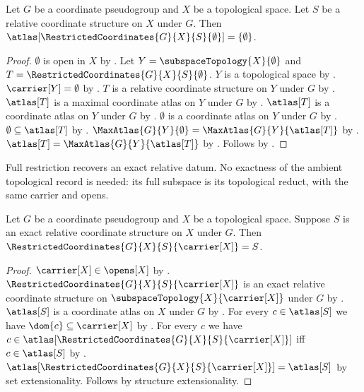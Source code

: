 \begin{theorem}\label{restricted_coordinates_empty_atlas}
    Let $G$ be a coordinate pseudogroup and $X$ be a topological space.
    Let $S$ be a relative coordinate structure on $X$ under $G$.
    Then $\atlas[\RestrictedCoordinates{G}{X}{S}{\emptyset}]=\{\emptyset\}$.
\end{theorem}
\begin{proof}
    $\emptyset$ is open in $X$ by .
    Let $Y=\subspaceTopology{X}{\emptyset}$ and $T=\RestrictedCoordinates{G}{X}{S}{\emptyset}$.
    $Y$ is a topological space by .
    $\carrier[Y]=\emptyset$ by .
    $T$ is a relative coordinate structure on $Y$ under $G$ by .
    $\atlas[T]$ is a maximal coordinate atlas on $Y$ under $G$ by .
    $\atlas[T]$ is a coordinate atlas on $Y$ under $G$ by .
    $\emptyset$ is a coordinate atlas on $Y$ under $G$ by .
    $\emptyset\subseteq\atlas[T]$ by .
    $\MaxAtlas{G}{Y}{\emptyset}=\MaxAtlas{G}{Y}{\atlas[T]}$ by
        .
    $\atlas[T]=\MaxAtlas{G}{Y}{\atlas[T]}$ by .
    Follows by .
\end{proof}

Full restriction recovers an exact relative datum. No exactness of the
ambient topological record is needed: its full subspace is its topological
reduct, with the same carrier and opens.

\begin{theorem}\label{restricted_coordinates_full}
    Let $G$ be a coordinate pseudogroup and $X$ be a topological space.
    Suppose $S$ is an exact relative coordinate structure on $X$ under $G$.
    Then $\RestrictedCoordinates{G}{X}{S}{\carrier[X]}=S$.
\end{theorem}
\begin{proof}
    $\carrier[X]\in\opens[X]$ by .
    $\RestrictedCoordinates{G}{X}{S}{\carrier[X]}$ is an exact relative coordinate structure
        on $\subspaceTopology{X}{\carrier[X]}$ under $G$ by .
    $\atlas[S]$ is a coordinate atlas on $X$ under $G$ by
        .
    For every $c\in\atlas[S]$ we have $\dom{c}\subseteq\carrier[X]$ by
        .
    For every $c$ we have $c\in\atlas[\RestrictedCoordinates{G}{X}{S}{\carrier[X]}]$ iff
        $c\in\atlas[S]$ by .
    $\atlas[\RestrictedCoordinates{G}{X}{S}{\carrier[X]}]=\atlas[S]$ by set extensionality.
    Follows by structure extensionality.
\end{proof}


